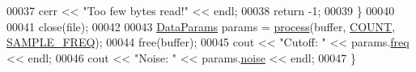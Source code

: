 \begin{DoxyCode}
00037         cerr << \textcolor{stringliteral}{"Too few bytes read!"} << endl;
00038         \textcolor{keywordflow}{return} -1;
00039     \}
00040 
00041     close(file);
00042 
00043     \hyperlink{structDataParams}{DataParams} params = \hyperlink{namespaceavda_a5196cce27286d08ca144a460caee7839}{process}(buffer, \hyperlink{process__test_8cpp_a698c124f1c293f98840449d6c5b9d984}{COUNT}, \hyperlink{definitions_8hpp_a8ace559345ecba7978591ac2ef22aea4}{SAMPLE\_FREQ});
00044     free(buffer);
00045     cout << \textcolor{stringliteral}{"Cutoff: "} << params.\hyperlink{structDataParams_a12566e017407647bc8287d62554ad3fb}{freq} << endl;
00046     cout << \textcolor{stringliteral}{"Noise: "} << params.\hyperlink{structDataParams_a4efd1d2231c6fa7c878c9d5e1650738f}{noise} << endl;
00047 \}
\end{DoxyCode}

